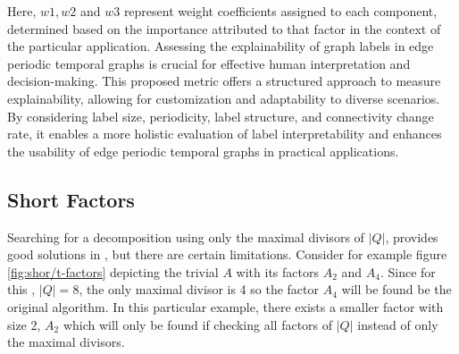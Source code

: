 Here, $w1, w2$ and $w3$ represent weight coefficients assigned to each component, determined based on the importance attributed to that factor in the context of the particular application. Assessing the explainability of graph labels in edge periodic temporal graphs is crucial for effective human interpretation and decision-making. This proposed metric offers a structured approach to measure explainability, allowing for customization and adaptability to diverse scenarios. By considering label size, periodicity, label structure, and connectivity change rate, it enables a more holistic evaluation of label interpretability and enhances the usability of edge periodic temporal graphs in practical applications.

\subsection{Short Factors}
Searching for a decomposition using only the maximal divisors of $|Q|$, provides good solutions in \LogSpace, but there are certain limitations. Consider for example figure \ref{fig:shor/t-factors} depicting the trivial \DFA $A$ with its factors $A_2$ and $A_4$. Since for this \DFA, $|Q| = 8$, the only maximal divisor is 4 so the factor $A_4$ will be found be the original algorithm. In this particular example, there exists a smaller factor with size 2, $A_2$ which will only be found if checking all factors of $|Q|$ instead of only the maximal divisors.

